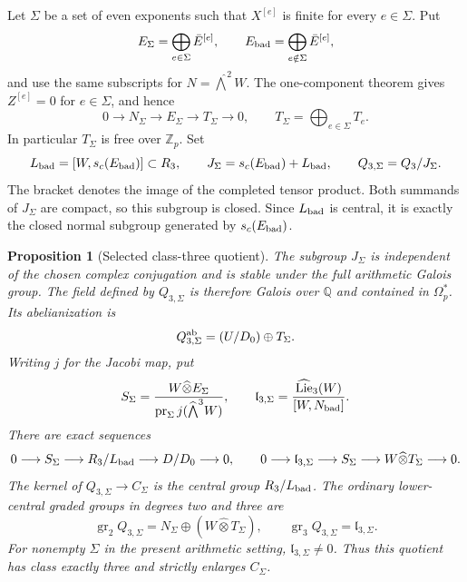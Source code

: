 \documentclass[11pt]{article}
\newtheorem{proposition}[theorem]{Proposition}
\theoremstyle{definition}\newtheorem{definition}[theorem]{Definition}
\begin{document}
Let $\Sigma$ be a set of even exponents such that $X^{[e]}$ is
finite for every $e\in\Sigma$.  Put
\[
 E_\Sigma=\bigoplus_{e\in\Sigma}\bar E^{[e]},\qquad
 E_{\rm bad}=\bigoplus_{e\notin\Sigma}\bar E^{[e]},
\]
and use the same subscripts for
$N=\widehat\bigwedge^2 W$.  The one-component theorem gives
$Z^{[e]}=0$ for $e\in\Sigma$, and hence
\[
 0\longrightarrow N_\Sigma\longrightarrow E_\Sigma
   \longrightarrow T_\Sigma\longrightarrow0,
 \qquad T_\Sigma=\bigoplus_{e\in\Sigma}T_e.
\]
In particular $T_\Sigma$ is free over $\mathbb Z_p$.
Set
\[
 L_{\rm bad}=[W,s_c(E_{\rm bad})]\subset R_3,
 \qquad
 J_\Sigma=s_c(E_{\rm bad})+L_{\rm bad},
 \qquad Q_{3,\Sigma}=Q_3/J_\Sigma.
\]
The bracket denotes the image of the completed tensor product.
Both summands of $J_\Sigma$ are compact, so this subgroup is
closed.  Since $L_{\rm bad}$ is central, it is exactly the closed
normal subgroup generated by $s_c(E_{\rm bad})$.

\begin{proposition}[Selected class-three quotient]
\label{prop:selected-class-three}
The subgroup $J_\Sigma$ is independent of the chosen complex
conjugation and is stable under the full arithmetic Galois group.
The field defined by $Q_{3,\Sigma}$ is therefore Galois over
$\mathbb Q$ and contained in $\Omega_p^*$.  Its abelianization is
\[
 Q_{3,\Sigma}^{\rm ab}=(U/D_0)\oplus T_\Sigma.
\]
Writing $j$ for the Jacobi map, put
\[
 S_\Sigma=
 \frac{W\widehat\otimes E_\Sigma}
 {\operatorname{pr}_\Sigma j(\widehat\bigwedge^3W)},
 \qquad
 \mathfrak l_{3,\Sigma}=
 \frac{\widehat{\operatorname{Lie}}_3(W)}{[W,N_{\rm bad}]}.
\]
There are exact sequences
\[
 0\longrightarrow S_\Sigma\longrightarrow
 R_3/L_{\rm bad}\longrightarrow D/D_0\longrightarrow0,
 \qquad
 0\longrightarrow \mathfrak l_{3,\Sigma}\longrightarrow S_\Sigma
 \longrightarrow W\widehat\otimes T_\Sigma\longrightarrow0.
\]
The kernel of $Q_{3,\Sigma}\to C_\Sigma$ is the central
group $R_3/L_{\rm bad}$.  The ordinary lower-central graded
groups in degrees two and three are
\[
 \operatorname{gr}_2Q_{3,\Sigma}
   =N_\Sigma\oplus(W\widehat\otimes T_\Sigma),
 \qquad
 \operatorname{gr}_3Q_{3,\Sigma}=\mathfrak l_{3,\Sigma}.
\]
For nonempty $\Sigma$ in the present arithmetic setting,
$\mathfrak l_{3,\Sigma}\ne0$.  Thus this quotient has class exactly three
and strictly enlarges $C_\Sigma$.
\end{proposition}
\end{document}
